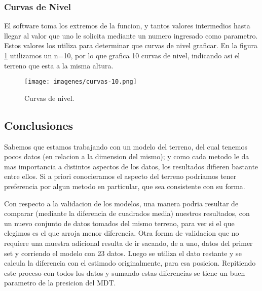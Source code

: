\documentclass{article}
\begin{document}
\subsubsection{Curvas de Nivel}
El software toma los extremos de la funcion, y tantos valores
intermedios hasta llegar al valor que uno le solicita mediante un
numero ingresado como parametro. Estos valores los utiliza para
determinar que curvas de nivel graficar. En la figura \ref{fig:curvas}
utilizamos un n=10, por lo que grafica 10 curvas de nivel, indicando
asi el terreno que esta a la misma altura.
\begin{figure}[H]
  \centering
  \texttt{[image: imagenes/curvas-10.png]}
  \caption{Curvas de nivel.}
  \label{fig:curvas}
\end{figure}

\subsection{Conclusiones}
Sabemos que estamos trabajando con un modelo del terreno, del cual
tenemos pocos datos (en relacion a la dimension del mismo); y como cada
metodo le da mas importancia a distintos aspectos de los datos, los
resultados difieren bastante entre ellos.
Si a priori conocieramos el aspecto del terreno podriamos tener
preferencia
por algun metodo en particular, que sea consistente con su forma. 

Con respecto a la validacion de los modelos, una manera podria resultar de
comparar (mediante la diferencia de cuadrados media)
nuestros resultados, con un nuevo conjunto de datos tomados del mismo
terreno, para ver si el que elegimos es el que arroja menor diferencia. 
Otra forma de validacion que no requiere una muestra adicional
resulta de ir sacando, de a uno, datos del
primer set y corriendo el modelo con 23 datos. Luego se utiliza el
dato restante y se calcula la diferencia con el estimado
originalmente, para esa posicion. Repitiendo este proceso con todos
los datos y sumando
estas diferencias se tiene un buen parametro de la presicion del MDT.

\newpage
\begin{appendix}
  \listoffigures
\end{appendix}
\end{document}

